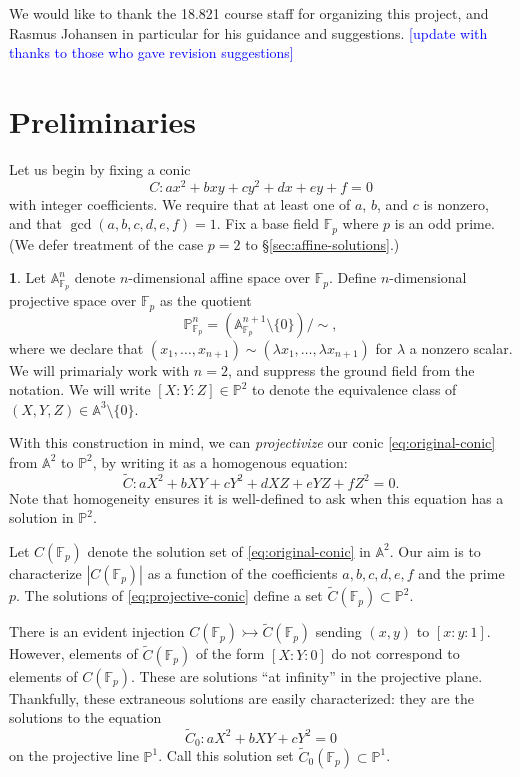 \documentclass[10pt,a4paper]{amsart}
\numberwithin{equation}{section}
\numberwithin{figure}{section}
\numberwithin{table}{section}
\theoremstyle{definition}
\theoremstyle{plain}
\theoremstyle{remark}
\theoremstyle{plain}
\theoremstyle{definition}
\newtheorem{defn}[thm]{\protect\definitionname}
\theoremstyle{plain}
\theoremstyle{plain}
\providecommand{\definitionname}{Definition}
\newcommand{\A}{\mathbb{A}}
\renewcommand{\P}{\mathbb{P}}
\newcommand{\F}{\mathbb{F}}
\begin{document}
	We would like to thank the 18.821 course staff for organizing this project, and Rasmus Johansen in particular for his guidance and suggestions. \textcolor{blue}{[update with thanks to those who gave revision suggestions]}
	\section{Preliminaries}\label{sec:projectivization-of-the-problem}
	
	Let us begin by fixing a conic
	\begin{equation}\label{eq:original-conic} 
	C \colon ax^2 + bxy + cy^2 + dx + ey + f = 0 
	\end{equation} 
	with integer coefficients. We require that at least one of 
	$a$, $b$, and $c$ is nonzero, and that $\gcd(a,b,c,d,e,f)=1$.
	Fix a base field $\F_p$ where $p$ is an odd prime. (We defer treatment of the case $p = 2$ to \S\ref{sec:affine-solutions}.)
	\begin{defn}
		Let $\A^n_{\F_p}$ denote $n$-dimensional affine space over $\F_p$. Define 
		$n$-dimensional projective space over $\F_p$ as the quotient
		\[ \P^n_{\F_p} = (\A^{n+1}_{\F_p}\setminus \{0\})/{\sim}, \]
		where we declare that $(x_1,\ldots,x_{n+1}) \sim 
		(\lambda x_1,\ldots,\lambda x_{n+1})$ for $\lambda$ a nonzero scalar. We
		will primarialy work with $n = 2$, and suppress the ground field from the 
		notation. We will write $[X:Y:Z]\in \P^2$ to denote the equivalence 
		class of $(X,Y,Z)\in \A^3 \setminus \{0\}$.
	\end{defn}
	
	With this construction in mind, we can \emph{projectivize} our conic
	\eqref{eq:original-conic} from $\A^2$ to $\P^2$, by writing it as a 
	homogenous equation: 
	\begin{equation}\label{eq:projective-conic} 
	\widetilde{C} \colon aX^2 + bXY + cY^2 + dXZ + eYZ + fZ^2 = 0. 
	\end{equation}
	Note that homogeneity ensures it is well-defined to ask when this
	equation has a solution in $\P^2$.
	
	Let $C(\F_p)$ denote the solution set of \eqref{eq:original-conic} in $\A^2$. Our aim
	is to characterize $|C(\F_p)|$ as a function of the coefficients $a,b,c,d,e,f$ and 
	the prime $p$. The solutions of \eqref{eq:projective-conic} define a set
	$\widetilde{C}(\F_p) \subset \P^2$.
	
	There is an evident injection $C(\F_p) \rightarrowtail \widetilde{C}(\F_p)$ sending $(x,y)$ to
	$[x:y:1]$. However, elements of $\widetilde{C}(\F_p)$ of the form $[X:Y:0]$ do not 
	correspond to elements of $C(\F_p)$. 
	These are solutions ``at infinity'' in the projective plane.
	Thankfully, these extraneous solutions are easily characterized: they are the
	solutions to the equation
	\begin{equation}\label{eq:projective-conic-at-infinity} 
	\widetilde{C}_0 \colon aX^2 + bXY + cY^2 = 0
	\end{equation} 
	on the projective line $\P^1$. Call this solution set $\widetilde{C}_0(\F_p)\subset \P^1$.  
	
\end{document}
